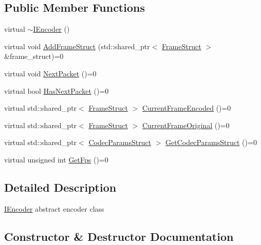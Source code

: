 \subsection*{Public Member Functions}
\begin{DoxyCompactItemize}
\item 
virtual \hyperlink{classmoetsi_1_1ssp_1_1IEncoder_a6c19808ebe6a05dbce630c45188b9346}{$\sim$\+I\+Encoder} ()
\item 
virtual void \hyperlink{classmoetsi_1_1ssp_1_1IEncoder_a8c223ec82fdd30ee8ee75157306054ec}{Add\+Frame\+Struct} (std\+::shared\+\_\+ptr$<$ \hyperlink{structmoetsi_1_1ssp_1_1FrameStruct}{Frame\+Struct} $>$ \&frame\+\_\+struct)=0
\item 
virtual void \hyperlink{classmoetsi_1_1ssp_1_1IEncoder_afac3ddcf2f49be16020c83cb9e0fb274}{Next\+Packet} ()=0
\item 
virtual bool \hyperlink{classmoetsi_1_1ssp_1_1IEncoder_a2af8e23d841ef61f6ee4037e56a3694d}{Has\+Next\+Packet} ()=0
\item 
virtual std\+::shared\+\_\+ptr$<$ \hyperlink{structmoetsi_1_1ssp_1_1FrameStruct}{Frame\+Struct} $>$ \hyperlink{classmoetsi_1_1ssp_1_1IEncoder_a178d117518e7c7007414ea9c82bd3ed6}{Current\+Frame\+Encoded} ()=0
\item 
virtual std\+::shared\+\_\+ptr$<$ \hyperlink{structmoetsi_1_1ssp_1_1FrameStruct}{Frame\+Struct} $>$ \hyperlink{classmoetsi_1_1ssp_1_1IEncoder_ab60bdaae0a85289dfa31a12bab533dc0}{Current\+Frame\+Original} ()=0
\item 
virtual std\+::shared\+\_\+ptr$<$ \hyperlink{structmoetsi_1_1ssp_1_1CodecParamsStruct}{Codec\+Params\+Struct} $>$ \hyperlink{classmoetsi_1_1ssp_1_1IEncoder_ad5179efaa4c74207766dd64f46f4059a}{Get\+Codec\+Params\+Struct} ()=0
\item 
virtual unsigned int \hyperlink{classmoetsi_1_1ssp_1_1IEncoder_ae6a865aa52230d81aed1cb5232402f6c}{Get\+Fps} ()=0
\end{DoxyCompactItemize}


\subsection{Detailed Description}
\hyperlink{classmoetsi_1_1ssp_1_1IEncoder}{I\+Encoder} abstract encoder class 

\subsection{Constructor \& Destructor Documentation}
\mbox{\label{classmoetsi_1_1ssp_1_1IEncoder_a6c19808ebe6a05dbce630c45188b9346}} 

